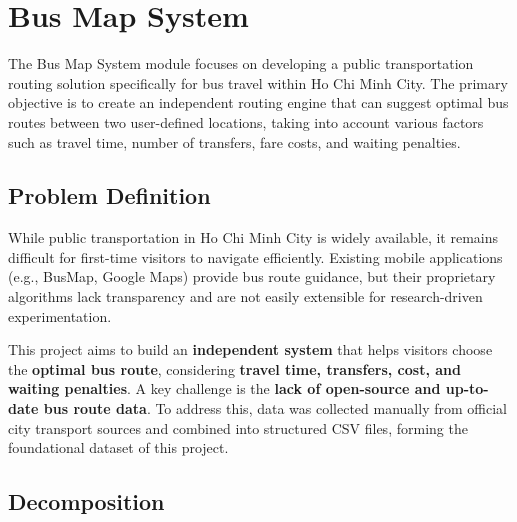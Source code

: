\chapter{Bus Map System}
\label{chap:busmap}
The Bus Map System module focuses on developing a public transportation routing solution specifically for bus travel within Ho Chi Minh City. The primary objective is to create an independent routing engine that can suggest optimal bus routes between two user-defined locations, taking into account various factors such as travel time, number of transfers, fare costs, and waiting penalties.


\section{Problem Definition}
While public transportation in Ho Chi Minh City is widely available, it remains difficult for first-time visitors to navigate efficiently. Existing mobile applications (e.g., BusMap, Google Maps) provide bus route guidance, but their proprietary algorithms lack transparency and are not easily extensible for research-driven experimentation.

This project aims to build an \textbf{independent system} that helps visitors choose the \textbf{optimal bus route}, considering \textbf{travel time, transfers, cost, and waiting penalties}. A key challenge is the \textbf{lack of open-source and up-to-date bus route data}. To address this, data was collected manually from official city transport sources and combined into structured CSV files, forming the foundational dataset of this project.

\section{Decomposition}


